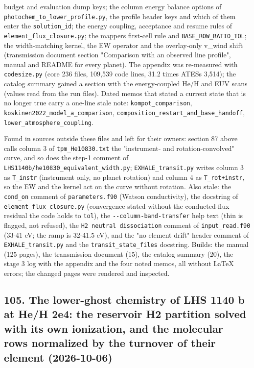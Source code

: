 \documentclass[english,a4paper]{my_memo}
\begin{document}
\begin{itemize}
  budget and evaluation dump keys; the column energy balance options of
  \texttt{photochem\_to\_lower\_profile.py}, the profile header keys and which of them
  enter the \texttt{solution\_id}; the energy coupling, acceptance and resume rules of
  \texttt{element\_flux\_closure.py}; the mapper\textquotesingle s first-cell rule and
  \texttt{BASE\_ROW\_RATIO\_TOL}; the width-matching kernel, the EW operator and the
  overlay-only v\_wind shift (transmission document section "Comparison with an
  observed line profile", manual and README for every planet). The appendix
  was re-measured with \texttt{codesize.py} (core 236 files, 109,539 code lines,
  31.2 times ATES\textquotesingle s 3,514); the catalog summary gained a section with the
  energy-coupled He/H and EUV scans (values read from the run files). Dated
  memos that stated a current state that is no longer true carry a one-line
  stale note: \texttt{kompot\_comparison}, \texttt{koskinen2022\_model\_a\_comparison},
  \texttt{composition\_restart\_and\_base\_handoff}, \texttt{lower\_atmosphere\_coupling}.
\end{itemize}

Found in sources outside these files and left for their owners: section 87
above calls column 3 of \texttt{tpm\_He10830.txt} the "instrument- and
rotation-convolved" curve, and so does the step-1 comment of
\texttt{LHS1140b/he10830\_equivalent\_width.py}; \texttt{EXHALE\_transit.py} writes column 3
as \texttt{T\_instr} (instrument only, no planet rotation) and column 4 as
\texttt{T\_rot+instr}, so the EW and the kernel act on the curve without rotation.
Also stale: the \texttt{cond\_on} comment of \texttt{parameters.f90} (Watson conductivity),
the docstring of \texttt{element\_flux\_closure.py} (convergence stated without the
conducted-flux residual the code holds to \texttt{tol}), the \texttt{-\/-column-band-transfer}
help text (thin is flagged, not refused), the \texttt{H2\ neutral\ dissociation}
comment of \texttt{input\_read.f90} (33-41 eV; the ramp is 32-41.5 eV), and the
"no element drift" header comment of \texttt{EXHALE\_transit.py} and the
\texttt{transit\_state\_files} docstring. Builds: the manual (125 pages), the
transmission document (15), the catalog summary (20), the stage 3 log with
the appendix and the four noted memos, all without LaTeX errors; the changed
pages were rendered and inspected.

\subsection{105. The lower-ghost chemistry of LHS 1140 b at He/H 2e4: the reservoir H2 partition solved with its own ionization, and the molecular rows normalized by the turnover of their element (2026-10-06)}\label{105-the-lower-ghost-chemistry-of-lhs-1140-b-at-heh-2e4-the-reservoir-h2-partition-solved-with-its-own-ionization-and-the-molecular-rows-normalized-by-the-turnover-of-their-element-2026-10-06}
\end{document}
